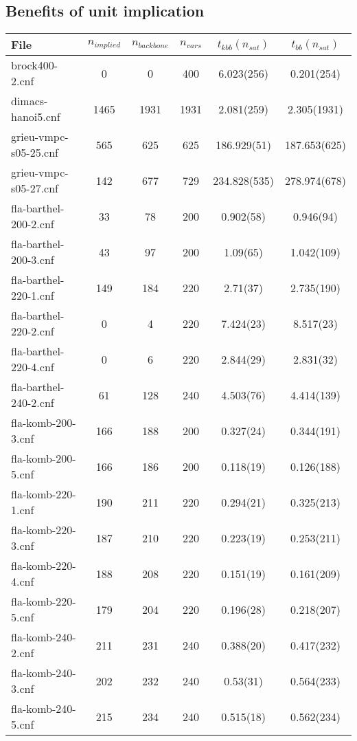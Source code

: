 \subsection{Benefits of unit implication}



\begin{table} %
\label{tab:satCompUnit} %
\begin{tabular}{l| c c c c c }
File & $n_{implied}$ & $n_{backbone}$ & $n_{vars}$ & $t_{kbb} (n_{sat})$ & $t_{bb} (n_{sat})$ \\
\hline
brock400-2.cnf & 0 & 0 & 400 & 6.023(256) & 0.201(254) \\
dimacs-hanoi5.cnf & 1465 & 1931 & 1931 & 2.081(259) & 2.305(1931) \\
grieu-vmpc-s05-25.cnf & 565 & 625 & 625 & 186.929(51) & 187.653(625) \\
grieu-vmpc-s05-27.cnf & 142 & 677 & 729 & 234.828(535) & 278.974(678) \\
fla-barthel-200-2.cnf & 33 & 78 & 200 & 0.902(58) & 0.946(94) \\
fla-barthel-200-3.cnf & 43 & 97 & 200 & 1.09(65) & 1.042(109) \\
fla-barthel-220-1.cnf & 149 & 184 & 220 & 2.71(37) & 2.735(190) \\
fla-barthel-220-2.cnf & 0 & 4 & 220 & 7.424(23) & 8.517(23) \\
fla-barthel-220-4.cnf & 0 & 6 & 220 & 2.844(29) & 2.831(32) \\
fla-barthel-240-2.cnf & 61 & 128 & 240 & 4.503(76) & 4.414(139) \\
fla-komb-200-3.cnf & 166 & 188 & 200 & 0.327(24) & 0.344(191) \\
fla-komb-200-5.cnf & 166 & 186 & 200 & 0.118(19) & 0.126(188) \\
fla-komb-220-1.cnf & 190 & 211 & 220 & 0.294(21) & 0.325(213) \\
fla-komb-220-3.cnf & 187 & 210 & 220 & 0.223(19) & 0.253(211) \\
fla-komb-220-4.cnf & 188 & 208 & 220 & 0.151(19) & 0.161(209) \\
fla-komb-220-5.cnf & 179 & 204 & 220 & 0.196(28) & 0.218(207) \\
fla-komb-240-2.cnf & 211 & 231 & 240 & 0.388(20) & 0.417(232) \\
fla-komb-240-3.cnf & 202 & 232 & 240 & 0.53(31) & 0.564(233) \\
fla-komb-240-5.cnf & 215 & 234 & 240 & 0.515(18) & 0.562(234) \\

\end{tabular}
\end{table}
